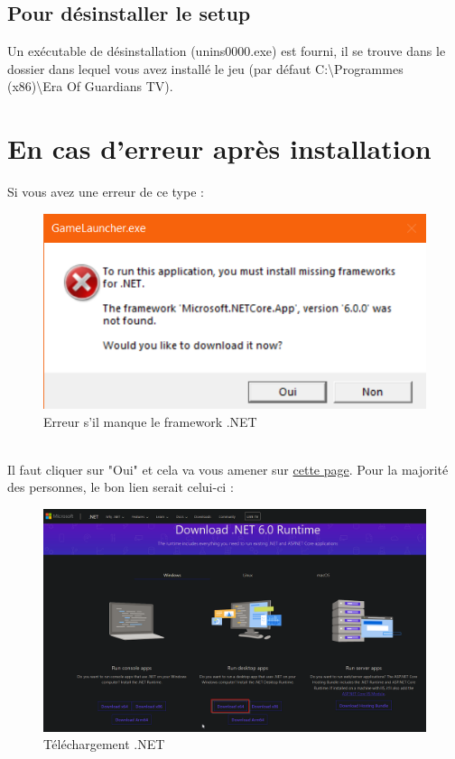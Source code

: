 \documentclass[a4paper, 12pt]{article}
\begin{document}
	\subsection{Pour désinstaller le setup}
	Un exécutable de désinstallation (unins0000.exe) est fourni, il se trouve dans le dossier dans lequel vous avez installé le jeu (par défaut C:\textbackslash Programmes (x86)\textbackslash Era Of Guardians TV).  
	
	\section{En cas d'erreur après installation}
	Si vous avez une erreur de ce type : 
	\begin{figure}[ht]
		\centering
		\includegraphics[scale=0.4]{images/erreur.png}
		\caption{Erreur s'il manque le framework .NET}
	\end{figure}
	\\
	Il faut cliquer sur "Oui" et cela va vous amener sur \href{https://dotnet.microsoft.com/en-us/download/dotnet/6.0/runtime?cid=getdotnetcore}{cette page}.
	Pour la  majorité des personnes, le bon lien serait celui-ci : 
	\begin{figure}[h!]
		\centering
		\includegraphics[scale=0.35]{images/dotnet.png}
		\caption{Téléchargement .NET}
	\end{figure}	
	
\end{document}
